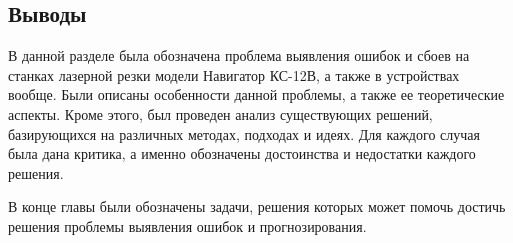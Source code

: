 \subsection{Выводы}

В данной разделе была обозначена проблема выявления ошибок и сбоев на станках лазерной резки модели Навигатор КС-12В,
а также в устройствах вообще.
Были описаны особенности данной проблемы, а также ее теоретические аспекты. Кроме этого, был проведен анализ
существующих решений, базирующихся на различных методах, подходах и идеях.
Для каждого случая была дана критика, а именно обозначены достоинства и недостатки каждого решения.

В конце главы были обозначены задачи, решения которых может помочь достичь решения проблемы выявления ошибок и прогнозирования.


\clearpage